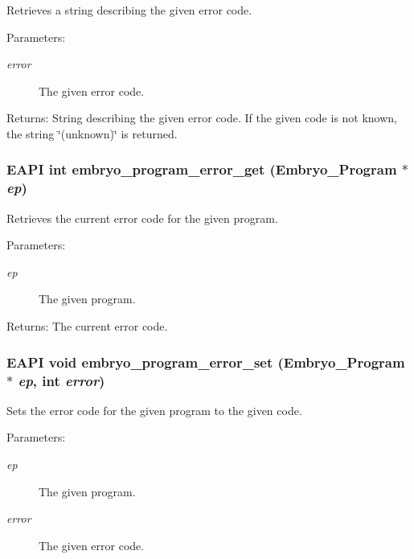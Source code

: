 Retrieves a string describing the given error code. 

\begin{Desc}
\item[Parameters:]
\begin{description}
\item[{\em error}]The given error code. \end{description}
\end{Desc}
\begin{Desc}
\item[Returns:]String describing the given error code. If the given code is not known, the string \char`\"{}(unknown)\char`\"{} is returned. \end{Desc}
\hypertarget{group__Embryo__Error__Group_g0f7550fc4564d7ccda4ddb7d4e96432e}{
\subsubsection{\setlength{\rightskip}{0pt plus 5cm}EAPI int embryo\_\-program\_\-error\_\-get (Embryo\_\-Program $\ast$ {\em ep})}}
\label{group__Embryo__Error__Group_g0f7550fc4564d7ccda4ddb7d4e96432e}


Retrieves the current error code for the given program. 

\begin{Desc}
\item[Parameters:]
\begin{description}
\item[{\em ep}]The given program. \end{description}
\end{Desc}
\begin{Desc}
\item[Returns:]The current error code. \end{Desc}
\hypertarget{group__Embryo__Error__Group_g3d331b8571f05d5893e02aa3561c27cf}{
\subsubsection{\setlength{\rightskip}{0pt plus 5cm}EAPI void embryo\_\-program\_\-error\_\-set (Embryo\_\-Program $\ast$ {\em ep}, \/  int {\em error})}}
\label{group__Embryo__Error__Group_g3d331b8571f05d5893e02aa3561c27cf}


Sets the error code for the given program to the given code. 

\begin{Desc}
\item[Parameters:]
\begin{description}
\item[{\em ep}]The given program. \item[{\em error}]The given error code. \end{description}
\end{Desc}
